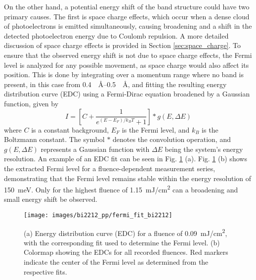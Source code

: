 On the other hand, a potential energy shift of the band structure could have two primary causes.
The first is space charge effects, which occur when a dense cloud of photoelectrons is emitted simultaneously, causing broadening and a shift in the detected photoelectron energy due to Coulomb repulsion.
A more detailed discussion of space charge effects is provided in Section \ref{sec:space_charge}.
To ensure that the observed energy shift is not due to space charge effects, the Fermi level is analyzed for any possible movement, as space charge would also affect its position.
This is done by integrating over a momentum range where no band is present, in this case from \qtyrange{0.4}{0.5}{\per\angstrom}, and fitting the resulting energy distribution curve (EDC) using a Fermi-Dirac equation broadened by a Gaussian function, given by
\begin{equation}
	I = \left[ C + \frac{1}{e^{(E-E_F)/k_BT}+1} \right] * g(E,\Delta E)
\end{equation}
where $C$ is a constant background, $E_F$ is the Fermi level, and $k_B$ is the Boltzmann constant.
The symbol $*$ denotes the convolution operation, and $g(E, \Delta E)$ represents a Gaussian function with $\Delta E$ being the system's energy resolution.
An example of an EDC fit can be seen in Fig. \ref{fig:fermi_fit_bi2212} (a).
Fig. \ref{fig:fermi_fit_bi2212} (b) shows the extracted Fermi level for a fluence-dependent measurement series, demonstrating that the Fermi level remains stable within the energy resolution of \qty{150}{\milli\electronvolt}.
Only for the highest fluence of \qty{1.15}{\milli\joule/\centi\meter\squared} can a broadening and small energy shift be observed.

\begin{figure}[bh!]
	\centering
	\texttt{[image: images/bi2212\_pp/fermi\_fit\_bi2212]}
	\caption{(a) Energy distribution curve (EDC) for a fluence of \qty{0.09}{\milli\joule/\centi\meter\squared}, with the corresponding fit used to determine the Fermi level. (b) Colormap showing the EDCs for all recorded fluences. Red markers indicate the center of the Fermi level as determined from the respective fits.}
	\label{fig:fermi_fit_bi2212}
\end{figure}

